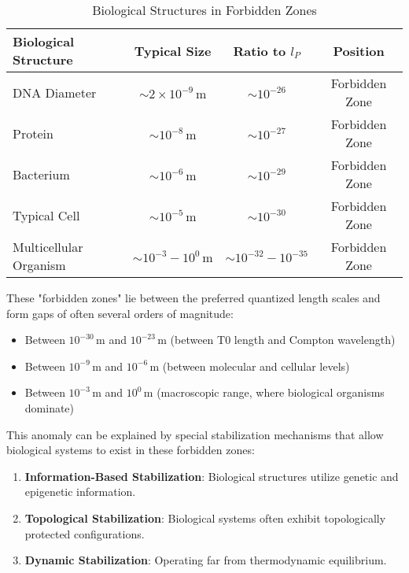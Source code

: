 \documentclass[12pt,a4paper]{article}
\begin{document}
	\begin{table}[H]
		\centering
		\begin{tabular}{lccc}
			\toprule
			\textbf{Biological Structure} & \textbf{Typical Size} & \textbf{Ratio to \(l_P\)} & \textbf{Position} \\
			\midrule
			DNA Diameter & \(\sim 2 \times 10^{-9} \, \text{m}\) & \(\sim 10^{-26}\) & Forbidden Zone \\
			Protein & \(\sim 10^{-8} \, \text{m}\) & \(\sim 10^{-27}\) & Forbidden Zone \\
			Bacterium & \(\sim 10^{-6} \, \text{m}\) & \(\sim 10^{-29}\) & Forbidden Zone \\
			Typical Cell & \(\sim 10^{-5} \, \text{m}\) & \(\sim 10^{-30}\) & Forbidden Zone \\
			Multicellular Organism & \(\sim 10^{-3} - 10^{0} \, \text{m}\) & \(\sim 10^{-32} - 10^{-35}\) & Forbidden Zone \\
			\bottomrule
		\end{tabular}
		\caption{Biological Structures in Forbidden Zones}
		\label{tab:biological_anomalies}
	\end{table}
	
	These "forbidden zones" lie between the preferred quantized length scales and form gaps of often several orders of magnitude:
	\begin{itemize}
		\item Between \(10^{-30} \, \text{m}\) and \(10^{-23} \, \text{m}\) (between T0 length and Compton wavelength)
		\item Between \(10^{-9} \, \text{m}\) and \(10^{-6} \, \text{m}\) (between molecular and cellular levels)
		\item Between \(10^{-3} \, \text{m}\) and \(10^{0} \, \text{m}\) (macroscopic range, where biological organisms dominate)
	\end{itemize}
	
	This anomaly can be explained by special stabilization mechanisms that allow biological systems to exist in these forbidden zones:
	
	\begin{enumerate}
		\item \textbf{Information-Based Stabilization}: Biological structures utilize genetic and epigenetic information.
		\item \textbf{Topological Stabilization}: Biological systems often exhibit topologically protected configurations.
		\item \textbf{Dynamic Stabilization}: Operating far from thermodynamic equilibrium.
	\end{enumerate}
	
\end{document}
